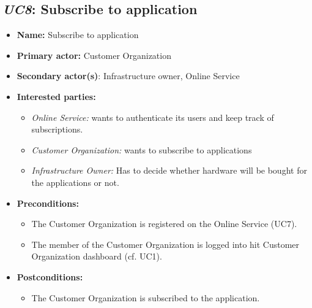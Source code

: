 \documentclass[english]{sareport}
\begin{document}
\subsection{\emph{UC8}: Subscribe to application}
\begin{itemize}
    \item \textbf{Name:} Subscribe to application
    \item \textbf{Primary actor:} Customer Organization
    \item \textbf{Secondary actor(s)}: Infrastructure owner, Online Service
    \item \textbf{Interested parties:} 
        \begin{itemize}
            \item \textit{Online Service:} wants to authenticate its users and keep track of subscriptions.
            \item \textit{Customer Organization:} wants to subscribe to applications
            \item \textit{Infrastructure Owner:} Has to decide whether hardware will be bought for the applications or not.
        \end{itemize}

    \item \textbf{Preconditions:}
        \begin{itemize}
            \item The Customer Organization is registered on the Online Service (UC7).
            \item The member of the Customer Organization is logged into hit Customer Organization dashboard (cf. UC1).
        \end{itemize}

    \item \textbf{Postconditions:}
        \begin{itemize}
            \item The Customer Organization is subscribed to the application.

        \end{itemize}


\end{itemize}
\end{document}
